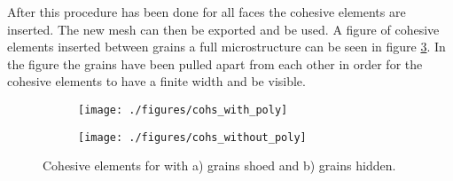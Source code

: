 \documentclass[grain_boundary_law.tex]{subfiles}
\begin{document}
After this procedure has been done for all faces the cohesive elements are inserted. The new mesh can then be exported and be used. A figure of cohesive elements inserted between grains a full microstructure can be seen in figure \ref{fig:cohs_large}. In the figure the grains have been pulled apart from each other in order for the cohesive elements to have a finite width and be visible.



\begin{figure}
\centering
\begin{subfigure}[b]{.5\textwidth}
  \centering
  \texttt{[image: ./figures/cohs\_with\_poly]}
  \caption{}
  \label{fig:cohs_large_a}
\end{subfigure}%
\begin{subfigure}[b]{.5\textwidth}
  \centering
  \texttt{[image: ./figures/cohs\_without\_poly]}
  \caption{}
  \label{fig:cohs_large_b}
\end{subfigure}
\caption{Cohesive elements for with a) grains shoed and b) grains hidden.}
\label{fig:cohs_large}
\end{figure}
\end{document}
